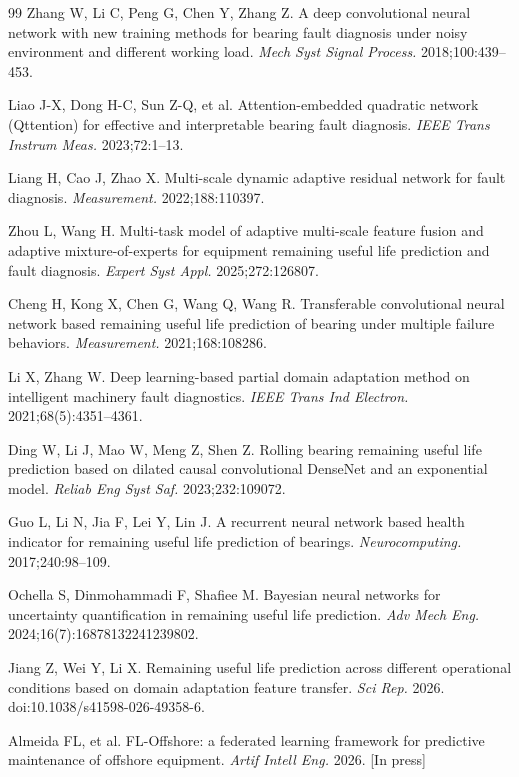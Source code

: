 \documentclass[AMA,Times1COL]{WileyNJDv5}
\begin{document}
\begin{thebibliography}{99}
Zhang W, Li C, Peng G, Chen Y, Zhang Z.
A deep convolutional neural network with new training methods for bearing
fault diagnosis under noisy environment and different working load.
\textit{Mech Syst Signal Process.} 2018;100:439--453.

Liao J-X, Dong H-C, Sun Z-Q, et al.
Attention-embedded quadratic network (Qttention) for effective and
interpretable bearing fault diagnosis.
\textit{IEEE Trans Instrum Meas.} 2023;72:1--13.

Liang H, Cao J, Zhao X.
Multi-scale dynamic adaptive residual network for fault diagnosis.
\textit{Measurement.} 2022;188:110397.

Zhou L, Wang H.
Multi-task model of adaptive multi-scale feature fusion and adaptive
mixture-of-experts for equipment remaining useful life prediction and
fault diagnosis.
\textit{Expert Syst Appl.} 2025;272:126807.

Cheng H, Kong X, Chen G, Wang Q, Wang R.
Transferable convolutional neural network based remaining useful life
prediction of bearing under multiple failure behaviors.
\textit{Measurement.} 2021;168:108286.

Li X, Zhang W.
Deep learning-based partial domain adaptation method on intelligent
machinery fault diagnostics.
\textit{IEEE Trans Ind Electron.} 2021;68(5):4351--4361.

Ding W, Li J, Mao W, Meng Z, Shen Z.
Rolling bearing remaining useful life prediction based on dilated
causal convolutional DenseNet and an exponential model.
\textit{Reliab Eng Syst Saf.} 2023;232:109072.

Guo L, Li N, Jia F, Lei Y, Lin J.
A recurrent neural network based health indicator for remaining useful
life prediction of bearings.
\textit{Neurocomputing.} 2017;240:98--109.

Ochella S, Dinmohammadi F, Shafiee M.
Bayesian neural networks for uncertainty quantification in remaining
useful life prediction.
\textit{Adv Mech Eng.} 2024;16(7):16878132241239802.

Jiang Z, Wei Y, Li X.
Remaining useful life prediction across different operational conditions
based on domain adaptation feature transfer.
\textit{Sci Rep.} 2026. doi:10.1038/s41598-026-49358-6.

Almeida FL, et al.
FL-Offshore: a federated learning framework for predictive maintenance
of offshore equipment.
\textit{Artif Intell Eng.} 2026. [In press]

\end{thebibliography}
\end{document}
